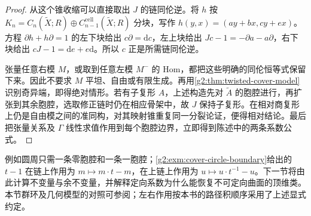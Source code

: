 \begin{proof}
	从这个锥收缩可以直接取出 \(J\) 的链同伦逆。将 \(h\) 按 \(K_n=C_n(\widetilde X;R)\oplus C_{n-1}^{\mathrm{cell}}(\widetilde X;R)\) 分块，写作 \(h(y,x)=(a y+b x,c y+e x)\)。方程 \(\partial h+h\partial=1\) 的左下块给出 \(c\partial=\mathrm d c\)，左上块给出 \(Jc-1=-\partial a-a\partial\)，右下块给出 \(cJ-1=\mathrm d e+e\mathrm d\)。所以 \(c\) 正是所需链同伦逆。

	张量任意右模 \(M\)，或取到任意左模 \(M^-\) 的 Hom，都把这些明确的同伦恒等式保留下来。因此不要求 \(M\) 平坦、自由或有限生成。再用\cref{g2:thm:twisted-cover-model}识别奇异端，即得绝对情形。若有子复形 \(A\)，上述构造先对 \(\widetilde A\) 的胞腔进行，再扩张到其余胞腔，选取修正链时仍在相应骨架中，故 \(J\) 保持子复形。在相对商复形上仍是自由模之间的准同构，对其映射锥重复同一分裂论证，便得相对结论。最后把张量关系及 \(\Gamma\) 线性求值作用到每个胞腔边界，立即得到陈述中的两条系数公式。
\end{proof}

例如圆周只需一条零胞腔和一条一胞腔；\cref{g2:exm:cover-circle-boundary}给出的 \(t-1\) 在链上作用为 \(m\mapsto m\cdot t-m\)，在上链上作用为 \(u\mapsto u\cdot t^{-1}-u\)。下一节将由此计算不变量与余不变量，并解释定向系数为什么能恢复不可定向曲面的顶维类。本节群环及几何模型的对照可参阅\cite[第3.H节，Local Coefficients]{Hatcher2002}；左右作用按本书的路径积顺序采用了上述显式约定。
